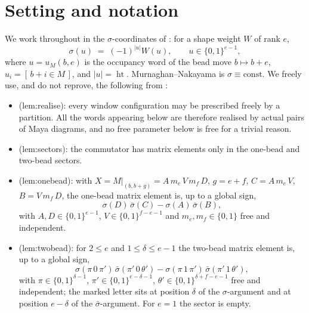 \documentclass[11pt]{article}
\theoremstyle{definition}
\theoremstyle{remark}
\newcommand{\height}{\operatorname{ht}}
\begin{document}
\section{Setting and notation}\label{sec:setup}

We work throughout in the $\sigma$-coordinates of \cite[Conv.~2.1]{Q149}: for a shape weight
$W$ of rank $e$,
\[
   \sigma(u)\;=\;(-1)^{|u|}W(u),\qquad u\in\{0,1\}^{e-1},
\]
where $u=u_M(b,e)$ is the occupancy word of the bead move $b\mapsto b+e$,
$u_i=[\,b+i\in M\,]$, and $|u|=\height$.  Murnaghan--Nakayama is $\sigma\equiv\text{const}$.
We freely use, and do not reprove, the following from \cite{Q149}:

\begin{itemize}
\item \cite[Lemma 3.1]{Q149} (\textsf{lem:realise}): every window configuration may be
  prescribed freely by a partition.  All the words appearing below are therefore realised by
  actual pairs of Maya diagrams, and no free parameter below is free for a trivial reason.
\item \cite[Lemma 4.1]{Q149} (\textsf{lem:sectors}): the commutator has matrix elements only
  in the one-bead and two-bead sectors.
\item \cite[Lemma 4.2]{Q149} (\textsf{lem:onebead}): with
  $X=M|_{(b,b+g)}=A\,m_e\,V\,m_f\,D$, $g=e+f$, $C=A\,m_e\,V$, $B=V\,m_f\,D$, the one-bead
  matrix element is, up to a global sign,
  \begin{equation}\label{eq:1B}
     \sigma(D)\,\bar\sigma(C)-\sigma(A)\,\bar\sigma(B),
  \end{equation}
  with $A,D\in\{0,1\}^{e-1}$, $V\in\{0,1\}^{f-e-1}$ and $m_e,m_f\in\{0,1\}$ free and
  independent.
\item \cite[Lemma 4.3]{Q149} (\textsf{lem:twobead}): for $2\le e$ and $1\le\delta\le e-1$ the
  two-bead matrix element is, up to a global sign,
  \begin{equation}\label{eq:2B}
     \sigma(\pi\,0\,\pi')\,\bar\sigma(\pi'\,0\,\theta')
     -\sigma(\pi\,1\,\pi')\,\bar\sigma(\pi'\,1\,\theta'),
  \end{equation}
  with $\pi\in\{0,1\}^{\delta-1}$, $\pi'\in\{0,1\}^{e-\delta-1}$,
  $\theta'\in\{0,1\}^{\delta+f-e-1}$ free and independent; the marked letter sits at
  position $\delta$ of the $\sigma$-argument and at position $e-\delta$ of the
  $\bar\sigma$-argument.  For $e=1$ the sector is empty.
\end{itemize}
\end{document}
